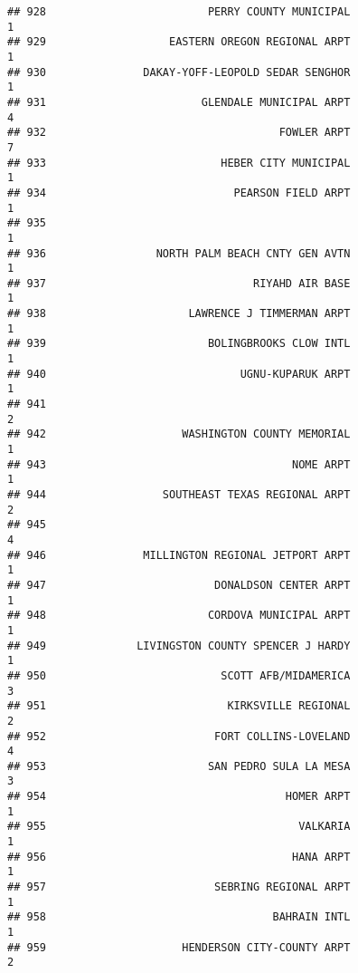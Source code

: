 \documentclass[
]{article}
\begin{document}
\begin{verbatim}
## 928                         PERRY COUNTY MUNICIPAL                           1
## 929                   EASTERN OREGON REGIONAL ARPT                           1
## 930               DAKAY-YOFF-LEOPOLD SEDAR SENGHOR                           1
## 931                        GLENDALE MUNICIPAL ARPT                           4
## 932                                    FOWLER ARPT                           7
## 933                           HEBER CITY MUNICIPAL                           1
## 934                             PEARSON FIELD ARPT                           1
## 935                                                                          1
## 936                 NORTH PALM BEACH CNTY GEN AVTN                           1
## 937                                RIYAHD AIR BASE                           1
## 938                      LAWRENCE J TIMMERMAN ARPT                           1
## 939                         BOLINGBROOKS CLOW INTL                           1
## 940                              UGNU-KUPARUK ARPT                           1
## 941                                                                          2
## 942                     WASHINGTON COUNTY MEMORIAL                           1
## 943                                      NOME ARPT                           1
## 944                  SOUTHEAST TEXAS REGIONAL ARPT                           2
## 945                                                                          4
## 946               MILLINGTON REGIONAL JETPORT ARPT                           1
## 947                          DONALDSON CENTER ARPT                           1
## 948                         CORDOVA MUNICIPAL ARPT                           1
## 949              LIVINGSTON COUNTY SPENCER J HARDY                           1
## 950                           SCOTT AFB/MIDAMERICA                           3
## 951                            KIRKSVILLE REGIONAL                           2
## 952                          FORT COLLINS-LOVELAND                           4
## 953                         SAN PEDRO SULA LA MESA                           3
## 954                                     HOMER ARPT                           1
## 955                                       VALKARIA                           1
## 956                                      HANA ARPT                           1
## 957                          SEBRING REGIONAL ARPT                           1
## 958                                   BAHRAIN INTL                           1
## 959                     HENDERSON CITY-COUNTY ARPT                           2

\end{verbatim}
\end{document}
